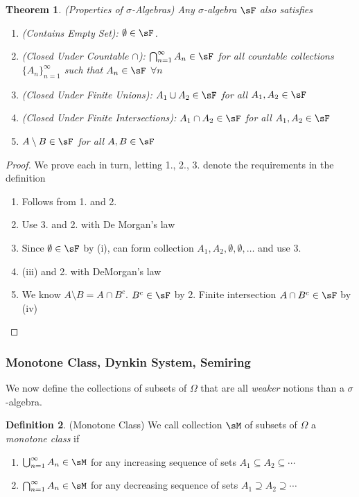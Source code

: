 \documentclass[12pt]{article}
\theoremstyle{plain}
\newtheorem{thm}{Theorem}[section]
\theoremstyle{definition}
\newtheorem{defn}[thm]{Definition}
\theoremstyle{remark}
\newcommand{\ninf}{_{n=1}^\infty}
\begin{document}
\begin{thm}\emph{(Properties of $\sigma$-Algebras)}
Any $\sigma$-algebra $\sF$ also satisfies
\begin{enumerate}[label=\emph{(\roman*)}]
  \item \emph{(Contains Empty Set):} $\emptyset\in\sF$.
  \item \emph{(Closed Under Countable $\cap$):}
    $\bigcap_{n=1}^\infty A_n \in \sF$ for all countable collections
    $\{A_n\}_{n=1}^\infty$ such that $A_n\in\sF$ $\forall n$
  \item \emph{(Closed Under Finite Unions):}
    $A_1\cup A_2\in\sF$ for all $A_1,A_2\in\sF$
  \item \emph{(Closed Under Finite Intersections):}
    $A_1\cap A_2\in\sF$ for all $A_1,A_2\in\sF$
  \item $A\setminus B\in\sF$ for all $A,B\in\sF$
\end{enumerate}
\end{thm}
\begin{proof}
We prove each in turn, letting 1., 2., 3. denote the requirements in the
definition
\begin{enumerate}[label=(\roman*)]
  \item Follows from 1. and 2.
  \item Use 3. and 2. with De Morgan's law
  \item Since $\emptyset\in\sF$ by (i), can form collection
    $A_1,A_2,\emptyset,\emptyset,\ldots$ and use 3.
  \item (iii) and 2. with DeMorgan's law
  \item We know $A\setminus B=A\cap B^c$.
    $B^c\in\sF$ by 2. Finite intersection $A\cap B^c\in\sF$ by (iv)
\end{enumerate}
\end{proof}

\clearpage
\subsubsection{Monotone Class, Dynkin System, Semiring}

We now define the collections of subsets of $\Omega$ that are all
\emph{weaker} notions than a $\sigma$-algebra.

\begin{defn}(Monotone Class)
We call collection $\sM$ of subsets of $\Omega$ a
\emph{monotone class} if
\begin{enumerate}
  \item $\bigcup\ninf A_n \in \sM$ for any increasing sequence of sets
    $A_1\subseteq A_2\subseteq\cdots$
  \item $\bigcap\ninf A_n \in \sM$ for any decreasing sequence of sets
    $A_1\supseteq A_2\supseteq\cdots$
\end{enumerate}
\end{defn}
\end{document}
